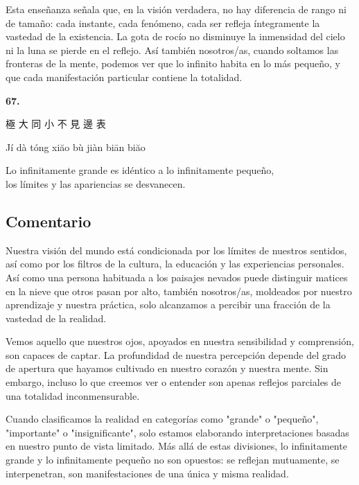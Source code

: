 \documentclass[
  a5paperpaper,
]{article}
\begin{document}
Esta enseñanza señala que, en la visión verdadera, no hay diferencia de
rango ni de tamaño: cada instante, cada fenómeno, cada ser refleja
íntegramente la vastedad de la existencia. La gota de rocío no disminuye
la inmensidad del cielo ni la luna se pierde en el reflejo. Así también
nosotros/as, cuando soltamos las fronteras de la mente, podemos ver que
lo infinito habita en lo más pequeño, y que cada manifestación
particular contiene la totalidad.

\hfill\break

\hypertarget{02}{}
\begin{verseblock}

\newpage

\begin{center}\textbf{67.}\end{center}

極 大 同 小 不 見 邊 表

Jí dà tóng xiăo bù jiàn biān biăo

Lo infinitamente grande es idéntico a lo infinitamente pequeño,\\
los límites y las apariencias se desvanecen.

\end{verseblock}

\hfill\break

\hypertarget{comentario-66}{%
\subsection{Comentario}\label{comentario-66}}

Nuestra visión del mundo está condicionada por los límites de nuestros
sentidos, así como por los filtros de la cultura, la educación y las
experiencias personales. Así como una persona habituada a los paisajes
nevados puede distinguir matices en la nieve que otros pasan por alto,
también nosotros/as, moldeados por nuestro aprendizaje y nuestra
práctica, solo alcanzamos a percibir una fracción de la vastedad de la
realidad.

Vemos aquello que nuestros ojos, apoyados en nuestra sensibilidad y
comprensión, son capaces de captar. La profundidad de nuestra percepción
depende del grado de apertura que hayamos cultivado en nuestro corazón y
nuestra mente. Sin embargo, incluso lo que creemos ver o entender son
apenas reflejos parciales de una totalidad inconmensurable.

Cuando clasificamos la realidad en categorías como "grande" o "pequeño",
"importante" o "insignificante", solo estamos elaborando
interpretaciones basadas en nuestro punto de vista limitado. Más allá de
estas divisiones, lo infinitamente grande y lo infinitamente pequeño no
son opuestos: se reflejan mutuamente, se interpenetran, son
manifestaciones de una única y misma realidad.
\end{document}
